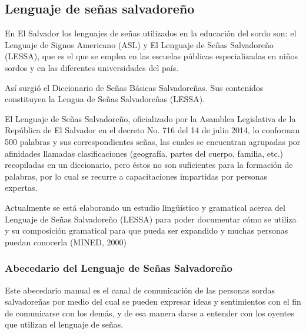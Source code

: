 \documentclass[12pt]{report}%
\begin{document}
\subsection{Lenguaje de señas salvadoreño}
En El Salvador los lenguajes de señas utilizados en la educación del sordo son: el Lenguaje de Signos Americano (ASL) y El Lenguaje de Señas Salvadoreño (LESSA), que es el que se emplea en las escuelas públicas especializadas en niños sordos y en las diferentes universidades del país.

Así surgió el Diccionario de Señas Básicas Salvadoreñas. Sus contenidos constituyen la Lengua de Señas Salvadoreñas (LESSA).

El Lenguaje de Señas Salvadoreño, oficializado por la Asamblea Legislativa de la República de El Salvador en el decreto No. 716 del 14 de julio 2014, lo conforman 500 palabras y sus correspondientes señas, las cuales se encuentran agrupadas por afinidades llamadas clasificaciones (geografía, partes del cuerpo, familia, etc.) recopiladas en un diccionario, pero éstos no son suficientes para la formación de palabras, por lo cual se recurre a capacitaciones impartidas por personas expertas.

Actualmente se está elaborando un estudio lingüístico y gramatical acerca del Lenguaje de Señas Salvadoreño (LESSA) para poder documentar cómo se utiliza y su composición gramatical para que pueda ser expandido y muchas personas puedan conocerla (MINED, 2000)

\subsubsection{Abecedario del Lenguaje de Señas Salvadoreño}

Este abecedario manual es el canal de comunicación de las personas sordas salvadoreñas por medio del cual se pueden expresar ideas y sentimientos con el fin de comunicarse con los demás, y de esa manera darse a entender con los oyentes que utilizan el lenguaje de señas.
\end{document}
